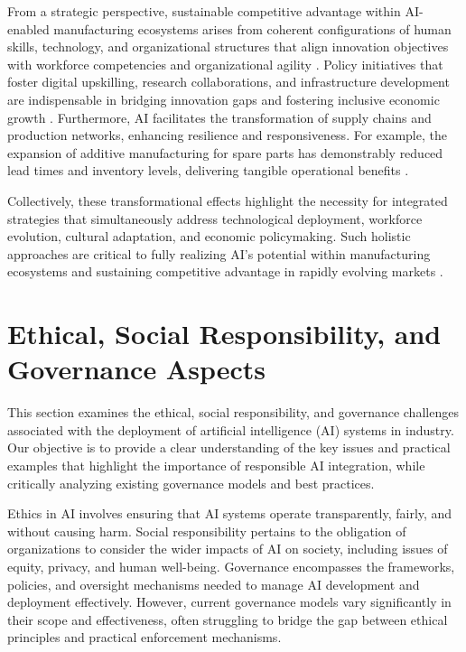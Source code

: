 \documentclass[sigconf]{acmart}
\begin{document}
From a strategic perspective, sustainable competitive advantage within AI-enabled manufacturing ecosystems arises from coherent configurations of human skills, technology, and organizational structures that align innovation objectives with workforce competencies and organizational agility \cite{ref36}. Policy initiatives that foster digital upskilling, research collaborations, and infrastructure development are indispensable in bridging innovation gaps and fostering inclusive economic growth \cite{ref38}. Furthermore, AI facilitates the transformation of supply chains and production networks, enhancing resilience and responsiveness. For example, the expansion of additive manufacturing for spare parts has demonstrably reduced lead times and inventory levels, delivering tangible operational benefits \cite{ref9}.

Collectively, these transformational effects highlight the necessity for integrated strategies that simultaneously address technological deployment, workforce evolution, cultural adaptation, and economic policymaking. Such holistic approaches are critical to fully realizing AI’s potential within manufacturing ecosystems and sustaining competitive advantage in rapidly evolving markets \cite{ref19,ref36,ref38}.

\section{Ethical, Social Responsibility, and Governance Aspects}

This section examines the ethical, social responsibility, and governance challenges associated with the deployment of artificial intelligence (AI) systems in industry. Our objective is to provide a clear understanding of the key issues and practical examples that highlight the importance of responsible AI integration, while critically analyzing existing governance models and best practices.

Ethics in AI involves ensuring that AI systems operate transparently, fairly, and without causing harm. Social responsibility pertains to the obligation of organizations to consider the wider impacts of AI on society, including issues of equity, privacy, and human well-being. Governance encompasses the frameworks, policies, and oversight mechanisms needed to manage AI development and deployment effectively. However, current governance models vary significantly in their scope and effectiveness, often struggling to bridge the gap between ethical principles and practical enforcement mechanisms.
\end{document}
